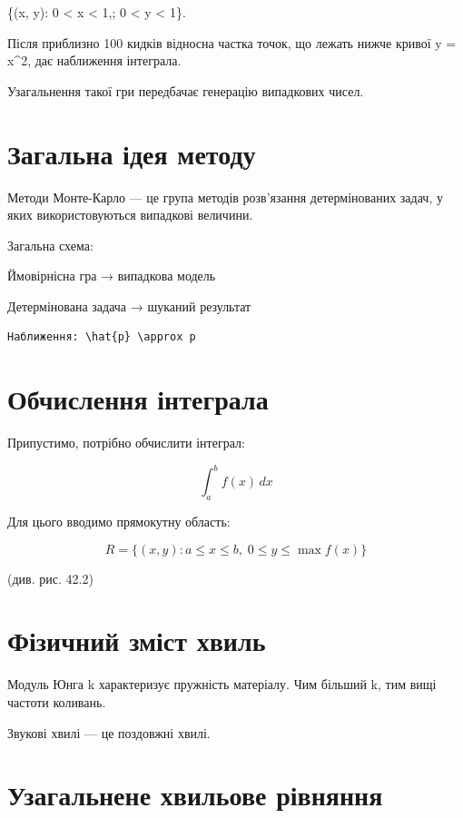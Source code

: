 \documentclass[
  ukrainian,
]{article}
\begin{document}
\{(x, y): 0 \textless{} x \textless{} 1,; 0 \textless{} y \textless{}
1\}.

Після приблизно 100 кидків відносна частка точок, що лежать нижче кривої
y = x\^{}2, дає наближення інтеграла.

Узагальнення такої гри передбачає генерацію випадкових чисел.

\section{Загальна ідея
методу}\label{ux437ux430ux433ux430ux43bux44cux43dux430-ux456ux434ux435ux44f-ux43cux435ux442ux43eux434ux443}

Методи Монте-Карло --- це група методів розв'язання детермінованих
задач, у яких використовуються випадкові величини.

Загальна схема:

Ймовірнісна гра → випадкова модель

Детермінована задача → шуканий результат

\begin{verbatim}
Наближення: \hat{p} \approx p
\end{verbatim}

\section{Обчислення
інтеграла}\label{ux43eux431ux447ux438ux441ux43bux435ux43dux43dux44f-ux456ux43dux442ux435ux433ux440ux430ux43bux430}

Припустимо, потрібно обчислити інтеграл:

\[
\int_a^b f(x)\,dx
\]

Для цього вводимо прямокутну область:

\[
R = \{(x,y): a \le x \le b,\; 0 \le y \le \max f(x)\}
\]

(див. рис. 42.2)

\section{Фізичний зміст
хвиль}\label{ux444ux456ux437ux438ux447ux43dux438ux439-ux437ux43cux456ux441ux442-ux445ux432ux438ux43bux44c}

Модуль Юнга k характеризує пружність матеріалу. Чим більший k, тим вищі
частоти коливань.

Звукові хвилі --- це поздовжні хвилі.

\section{Узагальнене хвильове
рівняння}\label{ux443ux437ux430ux433ux430ux43bux44cux43dux435ux43dux435-ux445ux432ux438ux43bux44cux43eux432ux435-ux440ux456ux432ux43dux44fux43dux43dux44f}
\end{document}
